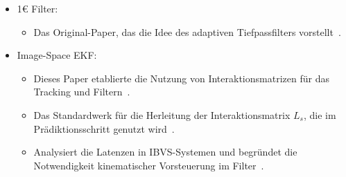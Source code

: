 \documentclass{article}
\begin{document}
\begin{itemize}
    \item 1\euro{} Filter: \begin{itemize}
        \item Das Original-Paper, das die Idee des adaptiven Tiefpassfilters vorstellt~\cite{casiez20121euro}.
    \end{itemize}
    \item Image-Space EKF: \begin{itemize}
        \item Dieses Paper etablierte die Nutzung von Interaktionsmatrizen für das Tracking und Filtern~\cite{comport2006real}.
        \item Das Standardwerk für die Herleitung der Interaktionsmatrix $L_s$, die im Prädiktionsschritt genutzt wird~\cite{chaumette2006visual}.
        \item Analysiert die Latenzen in IBVS-Systemen und begründet die Notwendigkeit kinematischer Vorsteuerung im Filter~\cite{corke1996dynamic}.
    \end{itemize}
\end{itemize}

\printbibliography
\end{document}
